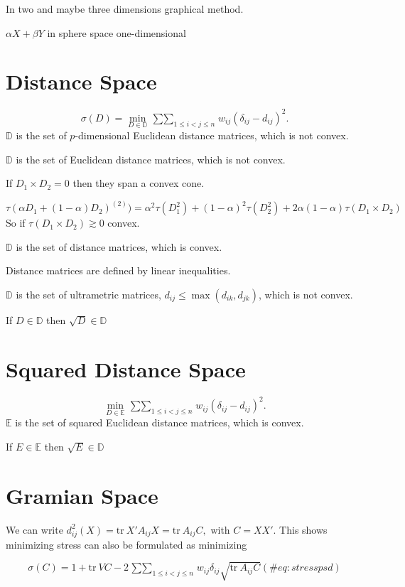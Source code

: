 \documentclass[
  12pt,
  letterpaper,
  DIV=11,
  numbers=noendperiod]{scrreprt}
\theoremstyle{remark}
\begin{document}
In two and maybe three dimensions graphical method.

\(\alpha X+\beta Y\) in sphere space one-dimensional

\section{Distance Space}\label{distance-space}

\[
\sigma(D)=\min_{D\in\mathbb{D}}\mathop{\sum\sum}_{1\leq i<j\leq n} w_{ij}(\delta_{ij}-d_{ij})^2.
\] \(\mathbb{D}\) is the set of \(p\)-dimensional Euclidean distance
matrices, which is not convex.

\(\mathbb{D}\) is the set of Euclidean distance matrices, which is not
convex.

If \(D_1\times D_2=0\) then they span a convex cone.

\[
\tau(\alpha D_1+(1-\alpha)D_2)^{(2)})=\alpha^2 \tau(D_1^2)+(1-\alpha)^2\tau(D_2^2)+2\alpha(1-\alpha)\tau(D_1\times D_2)
\] So if \(\tau(D_1\times D_2)\gtrsim 0\) convex.

\(\mathbb{D}\) is the set of distance matrices, which is convex.

Distance matrices are defined by linear inequalities.

\(\mathbb{D}\) is the set of ultrametric matrices,
\(d_{ij}\leq\max(d_{ik},d_{jk})\), which is not convex.

If \(D\in\mathbb{D}\) then \(\sqrt{D}\in\mathbb{D}\)

\section{Squared Distance Space}\label{squared-distance-space}

\[
\min_{D\in\mathbb{E}}\mathop{\sum\sum}_{1\leq i<j\leq n}w_{ij}(\delta_{ij}-d_{ij})^2.
\] \(\mathbb{E}\) is the set of squared Euclidean distance matrices,
which is convex.

If \(E\in\mathbb{E}\) then \(\sqrt{E}\in\mathbb{D}\)

\section{Gramian Space}\label{gramian-space}

We can write \(d_{ij}^2(X)=\text{tr}\ X'A_{ij}X = \text{tr}\ A_{ij}C,\)
with \(C=XX'\). This shows minimizing stress can also be formulated as
minimizing

\begin{equation}
\sigma(C)=1+\text{tr}\ VC-2\mathop{\sum\sum}_{1\leq i<j\leq n}w_{ij}\delta_{ij}\sqrt{\text{tr}\ A_{ij}C}
(\#eq:stresspsd)
\end{equation}
\end{document}
